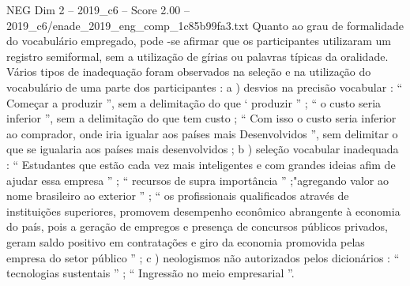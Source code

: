 \begin{textsample}{NEG Dim 2 – 2019\_c6 – Score 2.00 – 2019\_c6/enade\_2019\_eng\_comp\_1c85b99fa3.txt}
Quanto ao grau de formalidade do vocabulário empregado, pode -se afirmar que os participantes utilizaram um registro semiformal, sem a utilização de gírias ou palavras típicas da oralidade.
Vários tipos de inadequação foram observados na seleção e na utilização do vocabulário de uma parte dos participantes : a ) desvios na precisão vocabular : “ Começar a produzir ”, sem a delimitação do que ‘ produzir ” ; “ o custo seria inferior ”, sem a delimitação do que tem custo ; “ Com isso o custo seria inferior ao comprador, onde iria igualar aos países mais Desenvolvidos ”, sem delimitar o que se igualaria aos países mais desenvolvidos ; b ) seleção vocabular inadequada : “ Estudantes que estão cada vez mais inteligentes e com grandes ideias afim de ajudar essa empresa ” ; “ recursos de supra importância ” ;"agregando valor ao nome brasileiro ao exterior ” ; “ os profissionais qualificados através de instituições superiores, promovem desempenho econômico abrangente à economia do país, pois a geração de empregos e presença de concursos públicos privados, geram saldo positivo em contratações e giro da economia promovida pelas empresa do setor público ” ; c ) neologismos não autorizados pelos dicionários : “ tecnologias sustentais ” ; “ Ingressão no meio empresarial ”.

\end{textsample}
